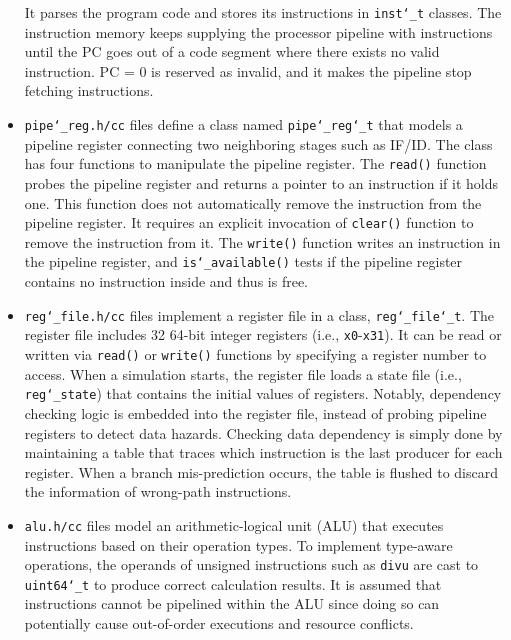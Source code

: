 \documentclass[10pt]{article}
\begin{document}
\begin{itemize}
{          It parses the program code and stores its instructions in {\tt inst\char`_t} classes.
          The instruction memory keeps supplying the processor pipeline with instructions until the PC goes out of a code segment where there exists no valid instruction.
          PC = 0 is reserved as invalid, and it makes the pipeline stop fetching instructions.}
    \item{{\tt pipe\char`_reg.h/cc} files define a class named {\tt pipe\char`_reg\char`_t} that models a pipeline register connecting two neighboring stages such as IF/ID.
          The class has four functions to manipulate the pipeline register.
          The {\tt read()} function probes the pipeline register and returns a pointer to an instruction if it holds one.
          This function does not automatically remove the instruction from the pipeline register.
          It requires an explicit invocation of {\tt clear()} function to remove the instruction from it.
          The {\tt write()} function writes an instruction in the pipeline register, and {\tt is\char`_available()} tests if the pipeline register contains no instruction inside and thus is free.}
    \item{{\tt reg\char`_file.h/cc} files implement a register file in a class, {\tt reg\char`_file\char`_t}.
          The register file includes 32 64-bit integer registers (i.e., {\tt x0}-{\tt x31}).
          It can be read or written via {\tt read()} or {\tt write()} functions by specifying a register number to access.
          When a simulation starts, the register file loads a state file (i.e., {\tt reg\char`_state}) that contains the initial values of registers.
          Notably, dependency checking logic is embedded into the register file, instead of probing pipeline registers to detect data hazards.
          Checking data dependency is simply done by maintaining a table that traces which instruction is the last producer for each register.
          When a branch mis-prediction occurs, the table is flushed to discard the information of wrong-path instructions.}
    \item{{\tt alu.h/cc} files model an arithmetic-logical unit (ALU) that executes instructions based on their operation types.
          To implement type-aware operations, the operands of unsigned instructions such as {\tt divu} are cast to {\tt uint64\char`_t} to produce correct calculation results.
          It is assumed that instructions cannot be pipelined within the ALU since doing so can potentially cause out-of-order executions and resource conflicts.
}
\end{itemize}
\end{document}
